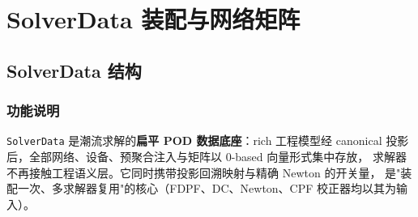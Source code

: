 \section{SolverData 装配与网络矩阵}\label{sec:assembly}

\subsection{SolverData 结构}


\subsubsection*{功能说明}
\texttt{SolverData} 是潮流求解的\textbf{扁平 POD 数据底座}：rich 工程模型经
canonical 投影后，全部网络、设备、预聚合注入与矩阵以 0-based 向量形式集中存放，
求解器不再接触工程语义层。它同时携带投影回溯映射与精确 Newton 的开关量，
是"装配一次、多求解器复用"的核心（FDPF、DC、Newton、CPF 校正器均以其为输入）。

